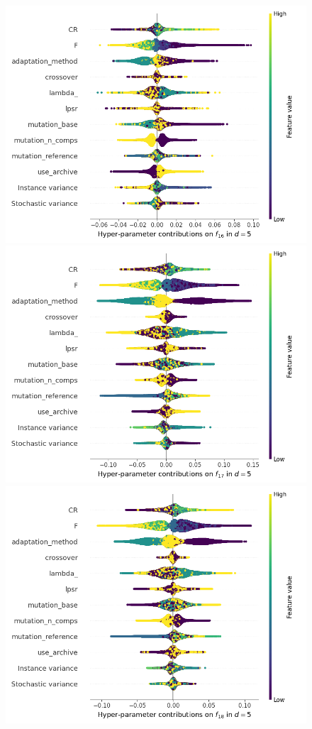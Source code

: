 \begin{figure}[t]
	\includegraphics[height=0.15\textheight,trim=60mm 0mm 0mm 0mm,clip]{de_img_new/img_summary_f16_d5.png}
	\includegraphics[height=0.15\textheight,trim=0mm 0mm 30mm 0mm,clip]{de_img_new/img_summary_f17_d5.png}
	\includegraphics[height=0.15\textheight,trim=60mm 0mm 30mm 0mm,clip]{de_img_new/img_summary_f18_d5.png}

\end{figure}
